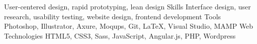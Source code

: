   \begin{cvskills}
                 {User-centered design, rapid prototyping, lean design}
  	\cvskill
		{Skills}
		{Interface design, user research, usability testing, website design, frontend development}
	\cvskill
		{Tools}
		{Photoshop, Illustrator, Axure, Moqups, Git, LaTeX, Visual Studio, MAMP}
  	\cvskill
		{Web Technologies}
		{HTML5, CSS3, Sass, JavaScript, Angular.js, PHP, Wordpress}
  \end{cvskills}